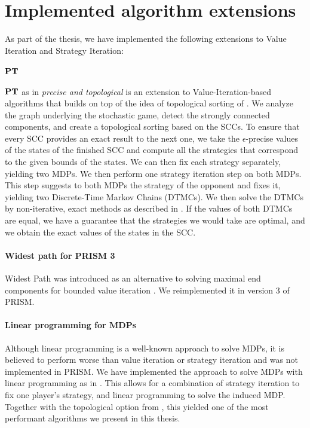 \chapter{Implemented algorithm extensions} \label{ch:implementedAlgos}
As part of the thesis, we have implemented the following extensions to Value Iteration and Strategy Iteration:

\subsubsection*{$\mathbf{PT}$} $\mathbf{PT}$ as in \emph{precise and topological} is an extension to Value-Iteration-based algorithms that builds on top of the idea of topological sorting of \cite{gandalf}.
We analyze the graph underlying the stochastic game, detect the strongly connected components, and create a topological sorting based on the SCCs.
To ensure that every SCC provides an exact result to the next one, we take the $\epsilon$-precise values of the states of the finished SCC and compute all the
strategies that correspond to the given bounds of the states.
We can then fix each strategy separately, yielding two MDPs. We then perform one strategy iteration step on both MDPs. This step suggests to both MDPs the strategy
of the opponent and fixes it, yielding two Discrete-Time Markov Chains (DTMCs). We then solve the DTMCs by non-iterative, exact methods as described in \cite{BaierBook}.
If the values of both DTMCs are equal, we have a guarantee that the strategies we would take are optimal, and we obtain the exact values of the states in the SCC.

\subsubsection*{Widest path for PRISM 3}
Widest Path was introduced as an alternative to solving maximal end components for bounded value iteration \cite{widestPath}.
We reimplemented it in version 3 of PRISM.

\subsubsection*{Linear programming for MDPs}
Although linear programming is a well-known approach to solve MDPs, it is believed to perform worse than value iteration or strategy iteration
and was not implemented in PRISM. We have implemented the approach to solve MDPs with linear programming as in \cite{Puterman}. 
This allows for a combination of strategy iteration to fix one player's strategy, and linear programming to solve the induced MDP.
Together with the topological option from \cite{gandalf}, this yielded one of the most performant algorithms we present in this thesis.